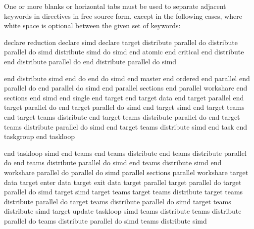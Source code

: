 One or more blanks or horizontal tabs must be used to separate adjacent keywords in 
directives in free source form, except in the following cases, where white space is 
optional between the given set of keywords:

\begin{figure}[t!]
\end{figure}

\begin{indentedcodelist}
declare reduction
declare simd
declare target
distribute parallel do
distribute parallel do simd
distribute simd
do simd
end atomic
end critical
end distribute 
end distribute parallel do
end distribute parallel do simd
\end{indentedcodelist}
\pagebreak
\begin{figure}[t!]
\end{figure}
\begin{indentedcodelist}
end distribute simd
end do
end do simd
end master
end ordered
end parallel
end parallel do
end parallel do simd
end parallel sections
end parallel workshare
end sections
end simd
end single
end target
end target data
end target parallel
end target parallel do
end target parallel do simd
end target simd
end target teams
end target teams distribute
end target teams distribute parallel do
end target teams distribute parallel do simd
end target teams distribute simd
end task
end taskgroup
end taskloop
\end{indentedcodelist}
\pagebreak
\begin{figure}[t!]
\end{figure}
\begin{indentedcodelist}
end taskloop simd
end teams
end teams distribute
end teams distribute parallel do
end teams distribute parallel do simd
end teams distribute simd
end workshare
parallel do
parallel do simd
parallel sections
parallel workshare
target data
target enter data
target exit data
target parallel
target parallel do
target parallel do simd
target simd
target teams
target teams distribute
target teams distribute parallel do
target teams distribute parallel do simd
target teams distribute simd
target update
taskloop simd
teams distribute
teams distribute parallel do
teams distribute parallel do simd
teams distribute simd
\end{indentedcodelist}


